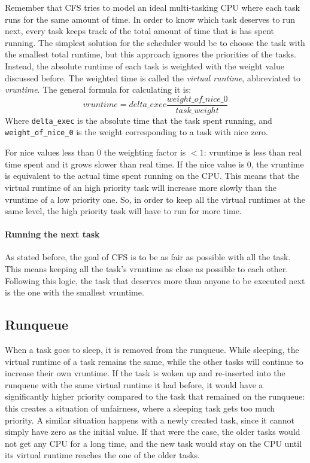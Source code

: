 Remember that CFS tries to model an ideal multi-tasking CPU where each task runs for the same amount of time. In order to know which task deserves to run next, every task keeps track of the total amount of time that is has spent running. The simplest solution for the scheduler would be to choose the task with the smallest total runtime, but this approach ignores the priorities of the tasks. Instead, the absolute runtime of each task is weighted with the weight value discussed before. The weighted time is called the \textit{virtual runtime}, abbreviated to \textit{vruntime}. The general formula for calculating it is:
\begin{equation} \label{eq:vruntime}
    vruntime = delta\_exec \frac{weight\_of\_nice\_0}{task\_weight}
\end{equation}
Where \verb|delta_exec| is the absolute time that the task spent running, and \verb|weight_of_nice_0| is the weight corresponding to a task with nice zero. 

For nice values less than 0 the weighting factor is $< 1$: vruntime is less than real time spent and it grows slower than real time. If the nice value is 0, the vruntime is equivalent to the actual time spent running on the CPU. This means that the virtual runtime of an high priority task will increase more slowly than the vruntime of a low priority one. So, in order to keep all the virtual runtimes at the same level, the high priority task will have to run for more time.

\paragraph{Running the next task}

As stated before, the goal of CFS is to be as fair as possible with all the task. This means keeping all the task's vruntime as close as possible to each other. Following this logic, the task that deserves more than anyone to be executed next is the one with the smallest vruntime.

\subsection{Runqueue}
When a task goes to sleep, it is removed from the runqueue. While sleeping, the virtual runtime of a task remains the same, while the other tasks will continue to increase their own vruntime. If the task is woken up and re-inserted into the runqueue with the same virtual runtime it had before, it would have a significantly higher priority compared to the task that remained on the runqueue: this creates a situation of unfairness, where a sleeping task gets too much priority.
A similar situation happens with a newly created task, since it cannot simply have zero as the initial value. If that were the case, the older tasks would not get any CPU for a long time, and the new task would stay on the CPU until its virtual runtime reaches the one of the older tasks.

